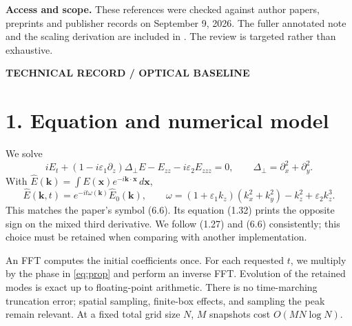 \documentclass[10pt,letterpaper]{article}
\newcommand{\eyebrow}[1]{{\color{teal}\normalsize\bfseries #1}\par}
\begin{document}
\textbf{Access and scope.} These references were checked against author papers,
preprints and publisher records on September 9, 2026. The fuller annotated note
and the scaling derivation are included in .
The review is targeted rather than exhaustive.
\newpage
{}\label{optical}

\eyebrow{TECHNICAL RECORD / OPTICAL BASELINE}
\section*{1. Equation and numerical model}
We solve
\begin{equation}
 iE_t+(1-i\varepsilon_1\partial_z)\Delta_\perp E-E_{zz}
       -i\varepsilon_2 E_{zzz}=0,
 \qquad \Delta_\perp=\partial_x^2+\partial_y^2.
 \label{eq:pde}
\end{equation}
With $\widehat E(\mathbf k)=\int E(\mathbf x)e^{-i\mathbf k\cdot\mathbf x}\,d\mathbf x$,
\begin{equation}
 \widehat E(\mathbf k,t)=e^{-it\omega(\mathbf k)}\widehat E_0(\mathbf k),\qquad
 \omega=(1+\varepsilon_1 k_z)(k_x^2+k_y^2)-k_z^2+\varepsilon_2k_z^3.
 \label{eq:prop}
\end{equation}
This matches the paper's symbol (6.6). Its equation (1.32) prints the opposite sign
on the mixed third derivative. We follow (1.27) and (6.6) consistently; this choice
must be retained when comparing with another implementation.

An FFT computes the initial coefficients once. For each requested $t$, we multiply
by the phase in \eqref{eq:prop} and perform an inverse FFT. Evolution of the retained
modes is exact up to floating-point arithmetic. There is no time-marching truncation
error; spatial sampling, finite-box effects, and sampling the peak remain relevant.
At a fixed total grid size $N$, $M$ snapshots cost $O(MN\log N)$.
\end{document}
